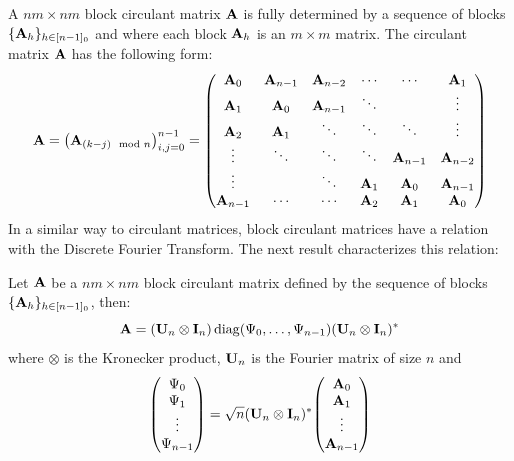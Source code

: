 A $nm\times nm$ block circulant matrix $\mathbf{A}$ is fully determined by a sequence of blocks $\{\mathbf{A}_h\}_{h \in [n-1]_0}$ and where each block $\mathbf{A}_h$ is an $m \times m$ matrix.
The circulant matrix $\mathbf{A}$ has the following form:
\begin{equation}
  \Amat = \leftmat \Amat_{(k-j) \mod n} \rightmat_{i, j = 0}^{n-1} = 
  \leftmatrix
    \Amat_{0}   & \Amat_{n-1} & \Amat_{n-2} & \cdots    & \cdots      & \Amat_{1}   \\
    \Amat_{1}   & \Amat_{0}   & \Amat_{n-1} & \ddots    &             & \vdots      \\
    \Amat_{2}   & \Amat_{1}   & \ddots      & \ddots    & \ddots      & \vdots      \\ 
    \vdots      & \ddots      & \ddots      & \ddots    & \Amat_{n-1} & \Amat_{n-2} \\
    \vdots      &             & \ddots      & \Amat_{1} & \Amat_{0}   & \Amat_{n-1} \\
    \Amat_{n-1} & \cdots      & \cdots      & \Amat_{2} & \Amat_{1}   & \Amat_{0}
  \rightmatrix
\end{equation}
\noindent
In a similar way to circulant matrices, block circulant matrices have a relation with the Discrete Fourier Transform.
The next result characterizes this relation:
\begin{theorem}
  Let $\mathbf{A}$ be a $nm\times nm$ block circulant matrix defined by the sequence of blocks $\{\mathbf{A}_h\}_{h \in [n-1]_0}$, then:
  \begin{equation}
    \mathbf{A} = (\mathbf{U}_n \otimes \mathbf{I}_n) \operatorname*{diag}(\Psi_0, \dots, \Psi_{n-1}) (\mathbf{U}_n \otimes \mathbf{I}_n)^*
  \end{equation}
  where $\otimes$ is the Kronecker product, $\mathbf{U}_n$ is the Fourier matrix of size $n$ and
  \begin{equation}
    \leftmatrix
      \Psi_{0} \\
      \Psi_{1} \\
      \vdots \\
      \Psi_{n-1} \\
    \rightmatrix = 
    \sqrt{n}(\Umat_n \otimes \Imat_n)^* 
    \leftmatrix
      \Amat_{0} \\
      \Amat_{1} \\
      \vdots \\
      \Amat_{n-1} \\
    \rightmatrix
  \end{equation}
\end{theorem}
